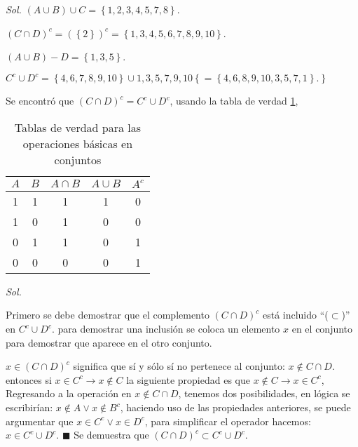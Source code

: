 \textit{ Sol. } $(A \cup B)\cup C = \left\{ 1,2,3,4,5,7,8 \right\}$.

$(C\cap D)^{c}=(\left\{ 2 \right\} )^{c} = \left\{ 1,3,4,5,6,7,8,9,10 \right\} $.

$(A\cup B)-D=\left\{ 1,3,5 \right\}$.

$C^{c} \cup D^{c}= \left\{ 4,6,7,8,9,10 \right\}  \cup1,3,5,7,9,10 \left\{ = \left\{ 4,6,8,9,10,3,5,7,1 \right\}.  \right\} $

Se encontró que $ (C \cap D)^{c} = C^{c} \cup D^{c}$, usando la tabla de verdad \ref{tabfmc14},

\begin{table}[h!]
	\centering
	\begin{tabular}{|c|c|c|c|c|}
		\hline
		\multicolumn{1}{|c|}{$A$} & \multicolumn{1}{|c|}{$B$} & \multicolumn{1}{|c|}{$A \cap B$} & \multicolumn{1}{|c|}{$A\cup B$} & $A^{c}$ \\ \hline
		1                         & 1                         & 1                                & 1                               & 0       \\ \hline
		1                         & 0                         & 1                                & 0                               & 0       \\ \hline
		0                         & 1                         & 1                                & 0                               & 1       \\ \hline
		0                         & 0                         & 0                                & 0                               & 1       \\ \hline
	\end{tabular}
	\caption{Tablas de verdad para las operaciones básicas en conjuntos}
	\label{tabfmc14}
\end{table}
\begin{exercise}[Demostración de la primera ley de morgan: $(C \cap D)^{c} = C^{c} \cup D^{c}$]
\end{exercise}
\textit{ Sol.}

Primero se debe demostrar que el complemento $(C \cap D)^{c}$ está incluido ``($\subset$)'' en  $C^{c} \cup D^{c}$.
para demostrar una inclusión se coloca un elemento $x$ en el conjunto para demostrar que aparece en el otro conjunto.

$x\in (C \cap D)^{c}$ significa que sí y sólo sí no pertenece al conjunto: $x\notin C \cap D$.
entonces si $x\in C^{c}\to x\notin C$ la siguiente propiedad es que $x\notin C\to x\in C^{c}$,
Regresando a la operación en  $x\notin C \cap D$, tenemos dos posibilidades, en lógica se escribirían:
$x\notin A \lor x \notin B^{c}$, haciendo uso de las propiedades anteriores, se puede argumentar que
$x\in C^{c} \lor x\in D^{c}$, para simplificar el operador hacemos: $x\in C^{c} \cup D^{c}$. $\blacksquare$ Se demuestra que
$(C \cap D)^{c} \subset C^{c} \cup D^{c}$.

